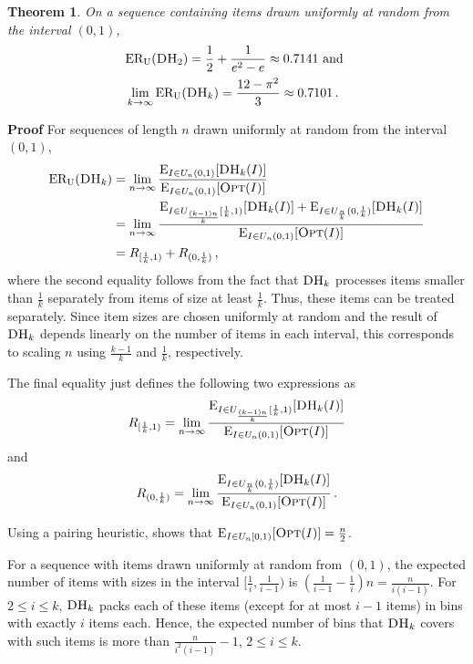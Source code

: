 \documentclass[11pt]{article}
\newtheorem{xtheorem}{Theorem}
\newenvironment{theorem}{\begin{xtheorem}\rm}{\end{xtheorem}}
\newenvironment{proof}{\begin{trivlist}\item[]{\bf Proof }}{\hspace*{\fill}\raisebox{-1pt}{\boldmath$\Box$}\end{trivlist}}
\newcommand{\OPT}{\ensuremath{\operatorname{\textsc{Opt}}}\xspace}
\newcommand{\DHk}{{\ensuremath{\textsc{DH}_k}}\xspace}
\newcommand{\DHtwo}{{\ensuremath{\textsc{DH}_{2}}}\xspace}
\newcommand{\EXPDIST}[2]{\ensuremath{\operatorname{E}_{#1}[#2]}}
\newcommand{\RDNF}{\ensuremath{R_{(0,\frac{1}{k})}}\xspace}
\newcommand{\RHar}{\ensuremath{R_{[\frac{1}{k},1)}}\xspace}
\newcommand{\ERU}[1]{\ensuremath{\mathrm{ER_U}(#1)}\xspace}
\begin{document}
\begin{theorem}
\label{theorem-uniform}
 On a sequence containing items drawn uniformly at random from the
 interval $(0,1)$, 
 \begin{align*}
 & \ERU{\DHtwo} = \frac{1}{2}+\frac{1}{e^2-e}\approx 0.7141 \text{ and }\\
 & \lim_{k \rightarrow \infty} \ERU{\DHk} = \frac{12-\pi^2}{3} \approx 0.7101\,.
 \end{align*}

\end{theorem}
\begin{proof}
For sequences of length $n$ drawn uniformly at random from the interval $(0,1)$,
 \begin{align*}
 \ERU{\DHk}
& = \lim_{n \rightarrow \infty}
  \frac{\EXPDIST{I\in U_n(0,1)}{\DHk(I)}}{\EXPDIST{I\in U_n(0,1)}{\OPT(I)}} \\
& = \lim_{n \rightarrow \infty}
  \frac{\EXPDIST{I\in U_{\frac{(k-1)n}{k}}[\frac{1}{k},1)}{\DHk(I)}
        +\EXPDIST{I\in U_{\frac{n}{k}}(0,\frac{1}{k})}{\DHk(I)}}
       {\EXPDIST{I\in U_n(0,1)}{\OPT(I)}} \\
& = \RHar + \RDNF \,,
 \end{align*}
where the second equality follows from the fact that \DHk processes
items smaller
than $\frac{1}{k}$ separately from items of size at least
$\frac{1}{k}$. Thus, these items can be treated separately.
Since item sizes are chosen uniformly at random and
the result of \DHk depends linearly on the number of items in each interval,
this corresponds to scaling $n$ using $\frac{k-1}{k}$ and $\frac{1}{k}$,
respectively. 

The final equality just defines the following two expressions as
 $$\RHar = \lim_{n \rightarrow \infty}
  \frac{\EXPDIST{I\in U_{\frac{(k-1)n}{k}}[\frac{1}{k},1)}{\DHk(I)}}
       {\EXPDIST{I\in U_n(0,1)}{\OPT(I)}}$$
and
$$   \RDNF = \lim_{n \rightarrow \infty}
  \frac{\EXPDIST{I\in U_{\frac{n}{k}}(0,\frac{1}{k})}{\DHk(I)}}
       {\EXPDIST{I\in U_n(0,1)}{\OPT(I)}}\,.$$


Using a pairing heuristic, \cite{CFGK91} shows that  
 $\EXPDIST{I\in U_n[0,1)}{\OPT(I)} = \frac{n}{2}$.

For a sequence with items drawn uniformly at random from $(0,1)$,
 the expected number of items with sizes
 in the interval $[\frac{1}{i},\frac{1}{i-1})$ is
 $(\frac{1}{i-1}-\frac{1}{i})n = \frac{n}{i(i-1)}$.
For $2 \leq
 i \leq k$, \DHk packs each of these items (except for at most $i-1$ items) 
 in bins with exactly $i$ items each.
Hence, the expected number of bins that \DHk
 covers with such items is more than
 $\frac{n}{i^2(i-1)}-1$, $2 \leq i \leq k$.


\end{proof}
\end{document}
